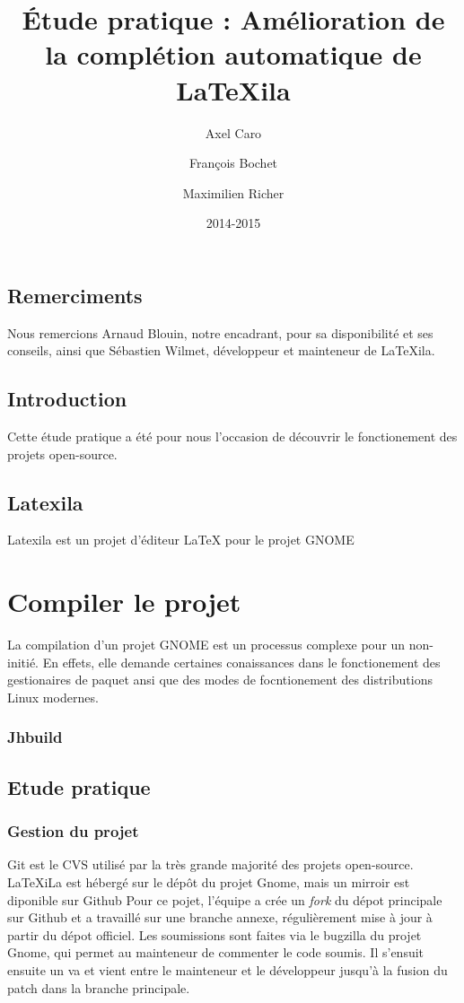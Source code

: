 \documentclass[a4paper,11pt]{report}
\title{Étude pratique : Amélioration de la complétion automatique de LaTeXila}
\author{Axel Caro\and François Bochet\and Maximilien Richer}
\date{2014-2015}
\begin{document}
\maketitle %

\section{Remerciments} %
\label{cha:remerciments}
Nous remercions Arnaud Blouin, notre encadrant, pour sa disponibilité et ses conseils, ainsi que Sébastien Wilmet, développeur et mainteneur de LaTeXila.

\section{Introduction}
\label{cha:Introduction}
Cette étude pratique a été pour nous l'occasion de découvrir le fonctionement des projets open-source.

\section{Latexila}
\label{sec:latexila}

Latexila est un projet d'éditeur LaTeX pour le projet GNOME

\chapter{Compiler le projet}
\label{cha:compiler}
La compilation d'un projet GNOME est un processus complexe pour un non-initié. En effets, elle demande certaines conaissances dans le fonctionement des gestionaires de paquet ansi que des modes de focntionement des distributions Linux modernes.

\subsection{Jhbuild}
\label{sub:jhbuild}

\section{Etude pratique} %
\label{cha:etude_pratique}

\subsection{Gestion du projet} %
\label{sub:git}
Git est le CVS utilisé par la très grande majorité des projets open-source. LaTeXiLa est hébergé sur le dépôt du projet Gnome, mais un mirroir est diponible sur Github %
Pour ce pojet, l'équipe a crée un \textit{fork} du dépot principale sur Github et a travaillé sur une branche annexe, régulièrement mise à jour à partir du dépot officiel.
Les soumissions sont faites via le bugzilla du projet Gnome, qui permet au mainteneur de commenter le code soumis. Il s'ensuit ensuite un va et vient entre le mainteneur et le développeur jusqu'à la fusion du patch dans la branche principale.
\end{document}
